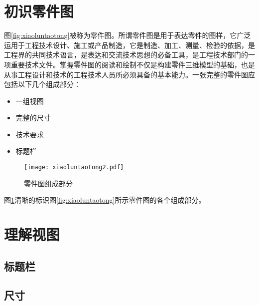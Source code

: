 \section{初识零件图}
图\ref{fig:xiaoluntaotong}被称为零件图。所谓零件图是用于表达零件的图样，它广泛运用于工程技术设计、施工或产品制造，它是制造、加工、测量、检验的依据，是工程界的共同技术语言，是表达和交流技术思想的必备工具，是工程技术部门的一项重要技术文件。掌握零件图的阅读和绘制不仅是构建零件三维模型的基础，也是从事工程设计和技术的工程技术人员所必须具备的基本能力。一张完整的零件图应包括以下几个组成部分：
\begin{itemize}
\item 一组视图
\item 完整的尺寸
\item 技术要求
\item 标题栏
\end{itemize}
\begin{figure}[htbp]
\centering
\texttt{[image: xiaoluntaotong2.pdf]}
\caption{零件图组成部分}\label{fig:xiaoluntaotong2}
\end{figure}
图\ref{fig:xiaoluntaotong2}清晰的标识图\ref{fig:xiaoluntaotong}所示零件图的各个组成部分。
\section{理解视图}
\subsection{标题栏}
\subsection{尺寸}

\endinput